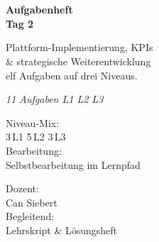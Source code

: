 \documentclass[11pt,a4paper,oneside]{article}
\newcommand{\caveatfontfallback}{\itshape}
\newcommand\caveatfont{\caveatfontfallback}%
\begin{document}
\begin{titlepage}
  \pagestyle{empty}
  \vspace*{1.5cm}
  \\[2pt]
  \noindent{\color{lpAccent}\rule{\linewidth}{1.2pt}}\\[4pt]

  \vspace{3cm}
  {\sffamily\fontsize{30}{34}\selectfont\bfseries\color{lpInk}Aufgabenheft\\Tag 2\par}

  \vspace{0.7cm}
  {\sffamily\large\color{lpGray}Plattform-Implementierung, KPIs\\\& strategische Weiterentwicklung\\\textendash{} elf Aufgaben auf drei Niveaus.\par}

  \vspace{1.5cm}
  {\caveatfont\LARGE\color{lpAmber}11 Aufgaben \textperiodcentered{} L1 \textperiodcentered{} L2 \textperiodcentered{} L3}\par

  \vfill

  \noindent\begin{minipage}{0.55\linewidth}
    {\sffamily\footnotesize\color{lpGray}Niveau-Mix:}\\
    {\sffamily\small\color{lpInk}3\,\textsf{L1} \textperiodcentered{} 5\,\textsf{L2} \textperiodcentered{} 3\,\textsf{L3}}\\[10pt]
    {\sffamily\footnotesize\color{lpGray}Bearbeitung:}\\
    {\sffamily\small\color{lpInk}Selbstbearbeitung im Lernpfad}
  \end{minipage}\hfill
  \begin{minipage}{0.4\linewidth}
    \raggedleft
    {\sffamily\footnotesize\color{lpGray}Dozent:}\\
    {\sffamily\small\color{lpInk}Can Siebert}\\[10pt]
    {\sffamily\footnotesize\color{lpGray}Begleitend:}\\
    {\sffamily\small\color{lpInk}Lehrskript \& Lösungsheft}
  \end{minipage}

  \vspace{0.5cm}
  \noindent{\color{lpAccent}\rule{\linewidth}{0.6pt}}
\end{titlepage}
\end{document}
